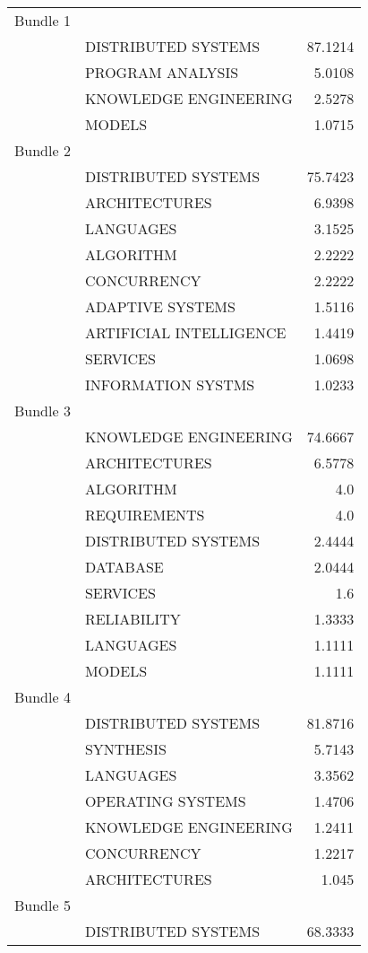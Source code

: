 \begin{center}
\begin{longtable}{|llr|}
    \hline
	Bundle 1 & ~ & ~  \\
	~ & DISTRIBUTED SYSTEMS & 87.1214 \\
	~ & PROGRAM ANALYSIS & 5.0108 \\
	~ & KNOWLEDGE ENGINEERING & 2.5278 \\
	~ & MODELS & 1.0715 \\
	Bundle 2 & ~ & ~  \\
	~ & DISTRIBUTED SYSTEMS &75.7423 \\
	~ & ARCHITECTURES &6.9398 \\
	~ & LANGUAGES & 3.1525 \\
	~ & ALGORITHM & 2.2222 \\
	~ & CONCURRENCY & 2.2222 \\
	~ & ADAPTIVE SYSTEMS & 1.5116 \\
	~ & ARTIFICIAL INTELLIGENCE & 1.4419 \\
	~ & SERVICES & 1.0698 \\
	~ & INFORMATION SYSTMS & 1.0233 \\
	Bundle 3 & ~ & ~  \\
	~ & KNOWLEDGE ENGINEERING & 74.6667 \\
	~ & ARCHITECTURES & 6.5778 \\
	~ & ALGORITHM & 4.0 \\
	~ & REQUIREMENTS & 4.0 \\
	~ & DISTRIBUTED SYSTEMS & 2.4444 \\
	~ & DATABASE & 2.0444 \\
	~ & SERVICES & 1.6 \\
	~ & RELIABILITY & 1.3333 \\
	~ & LANGUAGES & 1.1111 \\
	~ & MODELS & 1.1111 \\
	Bundle 4 & ~ & ~  \\
	~ & DISTRIBUTED SYSTEMS & 81.8716 \\
	~ & SYNTHESIS & 5.7143 \\
	~ & LANGUAGES & 3.3562 \\
	~ & OPERATING SYSTEMS & 1.4706 \\
	~ & KNOWLEDGE ENGINEERING & 1.2411 \\
	~ & CONCURRENCY & 1.2217 \\
	~ & ARCHITECTURES & 1.045 \\
	Bundle 5 & ~ & ~  \\
	~ & DISTRIBUTED SYSTEMS & 68.3333 \\

\end{longtable}
\end{center}

